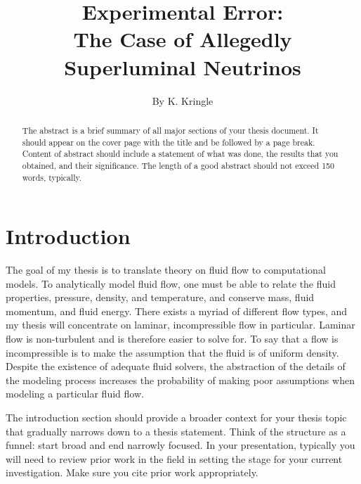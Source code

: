 \documentclass[twocolumn,12pt]{article}
\title{Experimental Error:  \\
The Case of Allegedly Superluminal Neutrinos}
\author{ By K. Kringle
}
\begin{document}
\maketitle

\def\bd{\begin{displaymath}}
\def\be{\begin{equation}}
\def\ed{\end{displaymath}}
\def\ee{\end{equation}}

\doublespacing

\begin{abstract} 
\noindent The abstract is a brief summary of all major sections of your thesis document.   It should appear on the cover page with the title and be followed by a page break.  Content of abstract should include a statement of what was done, the results that you obtained, and their significance.   The length of a good abstract should not exceed 150 words, typically.
\end{abstract}

\clearpage


\section{Introduction}

The goal of my thesis is to translate theory on fluid flow to computational models. To analytically model fluid flow, one must be able to relate the fluid properties, pressure, density, and temperature, and conserve mass, fluid momentum, and fluid energy. There exists a myriad of different flow types, and my thesis will concentrate on laminar, incompressible flow in particular. Laminar flow is non-turbulent and is therefore easier to solve for. To say that a flow is incompressible is to make the assumption that the fluid is of uniform density. Despite the existence of adequate fluid solvers, the abstraction of the details of the modeling process increases the probability of making poor assumptions when modeling a particular fluid flow.  

The introduction section should provide a broader context for your thesis topic that gradually narrows down to a thesis statement.  Think of the structure as a funnel:  start broad and end narrowly focused.  In your presentation, typically you will need to review prior work in the field in setting the stage for your current investigation.  Make sure you cite prior work appropriately.\cite{a-ref}
\end{document}
